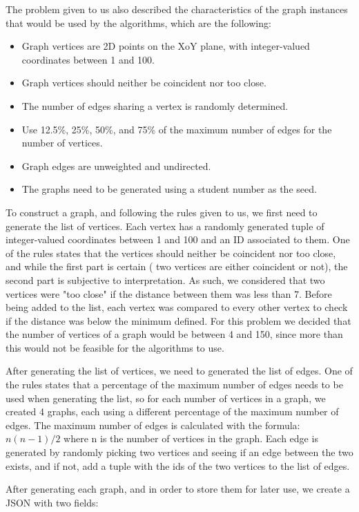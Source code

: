 \documentclass[]{revdetua}
\begin{document}
The problem given to us also described the characteristics of the graph instances that would be used by the algorithms, which are the following:

\begin{itemize}
\item Graph vertices are 2D points on the XoY plane, with integer-valued coordinates between 1 and 100.
\item Graph vertices should neither be coincident nor too close.
\item The number of edges sharing a vertex is randomly determined.
\item Use 12.5\%, 25\%, 50\%, and 75\% of the maximum number of edges for the number of vertices.
\item Graph edges are unweighted and undirected.
\item The graphs need to be generated using a student number as the seed.
\end{itemize}

To construct a graph, and following the rules given to us, we first need to generate the list of vertices. Each vertex has a randomly generated tuple of integer-valued coordinates between 1 and 100 and an ID associated to them. One of the rules states that the vertices should neither be coincident nor too close, and while the first part is certain ( two vertices are either coincident or not), the second part is subjective to interpretation. As such, we considered that two vertices were "too close" if the distance between them was less than 7. Before being added to the list, each vertex was compared to every other vertex to check if the distance was below the minimum defined. For this problem we decided that the number of vertices of a graph would be between 4 and 150, since more than this would not be feasible for the algorithms to use.

After generating the list of vertices, we need to generated the list of edges. One of the rules states that a percentage of the maximum number of edges needs to be used when generating the list, so for each number of vertices in a graph, we created 4 graphs, each using a different percentage of the maximum number of edges. The maximum number of edges is calculated with the formula: \( n(n-1)/2 \) where n is the number of vertices in the graph. Each edge is generated by randomly picking two vertices and seeing if an edge between the two exists, and if not, add a tuple with the ids of the two vertices to the list of edges.

After generating each graph, and in order to store them for later use, we create a JSON with two fields:
\end{document}

